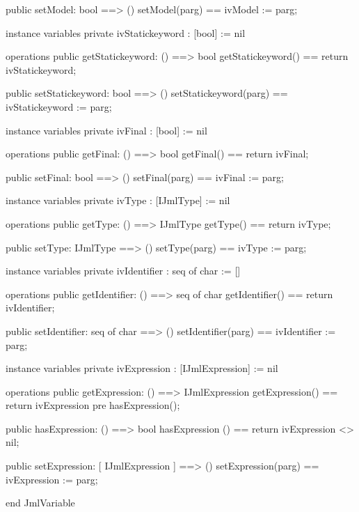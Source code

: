 \begin{vdm_al}
  public setModel: bool ==> ()
  setModel(parg) == ivModel := parg;

instance variables
  private ivStatickeyword : [bool] := nil

operations
  public getStatickeyword: () ==> bool
  getStatickeyword() == return ivStatickeyword;

  public setStatickeyword: bool ==> ()
  setStatickeyword(parg) == ivStatickeyword := parg;

instance variables
  private ivFinal : [bool] := nil

operations
  public getFinal: () ==> bool
  getFinal() == return ivFinal;

  public setFinal: bool ==> ()
  setFinal(parg) == ivFinal := parg;

instance variables
  private ivType : [IJmlType] := nil

operations
  public getType: () ==> IJmlType
  getType() == return ivType;

  public setType: IJmlType ==> ()
  setType(parg) == ivType := parg;

instance variables
  private ivIdentifier : seq of char := []

operations
  public getIdentifier: () ==> seq of char
  getIdentifier() == return ivIdentifier;

  public setIdentifier: seq of char ==> ()
  setIdentifier(parg) == ivIdentifier := parg;

instance variables
  private ivExpression : [IJmlExpression] := nil

operations
  public getExpression: () ==> IJmlExpression
  getExpression() == return ivExpression
    pre hasExpression();

  public hasExpression: () ==> bool
  hasExpression () == return ivExpression <> nil;

  public setExpression: [ IJmlExpression ] ==> ()
  setExpression(parg) == ivExpression := parg;

end JmlVariable
\end{vdm_al}


